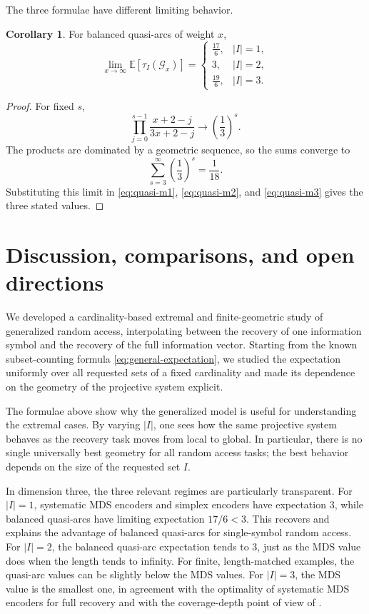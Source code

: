 \documentclass[11pt,a4paper]{article}
\numberwithin{equation}{section}
\theoremstyle{definition}
\theoremstyle{definition}
\newtheorem{corollary}[definition]{Corollary}
\newcommand{\E}{\mathbb{E}}
\newcommand{\cG}{\mathcal{G}}
\begin{document}
The three formulae have different limiting behavior.

\begin{corollary}\label{cor:quasi-asymptotics}
For balanced quasi-arcs of weight $x$,
\[
\lim_{x\to\infty}\E[\tau_I(\cG_x)]
=
\begin{cases}
\frac{17}{6}, & |I|=1,\\[1mm]
3, & |I|=2,\\[1mm]
\frac{19}{6}, & |I|=3.
\end{cases}
\]
\end{corollary}

\begin{proof}
For fixed $s$,
\[
\prod_{j=0}^{s-1}\frac{x+2-j}{3x+2-j}\longrightarrow \left(\frac13\right)^s.
\]
The products are dominated by a geometric sequence, so the sums converge to
\[
\sum_{s=3}^{\infty}\left(\frac13\right)^s=\frac{1}{18}.
\]
Substituting this limit in \eqref{eq:quasi-m1}, \eqref{eq:quasi-m2}, and \eqref{eq:quasi-m3} gives the three stated values.
\end{proof}

\section{Discussion, comparisons, and open directions}\label{sec:discussion}

{We developed a cardinality-based extremal and finite-geometric study of generalized random access, interpolating between the recovery of one information symbol and the recovery of the full information vector.  Starting from the known subset-counting formula \eqref{eq:general-expectation}, we studied the expectation uniformly over all requested sets of a fixed cardinality and made its dependence on the geometry of the projective system explicit.}

The formulae above show why the generalized model is useful for understanding the extremal cases.  By varying $|I|$, one sees how the same projective system behaves as the recovery task moves from local to global.  In particular, there is no single universally best geometry for all random access tasks; the best behavior depends on the size of the requested set $I$.

In dimension three, the three relevant regimes are particularly transparent.  For $|I|=1$, systematic MDS encoders and simplex encoders have expectation $3$, while balanced quasi-arcs have limiting expectation $17/6<3$.  This recovers and explains the advantage of balanced quasi-arcs for single-symbol random access.  For $|I|=2$, the balanced quasi-arc expectation tends to $3$, just as the MDS value does when the length tends to infinity.  For finite, length-matched examples, the quasi-arc values can be slightly below the MDS values.  For $|I|=3$, the MDS value is the smallest one, in agreement with the optimality of systematic MDS encoders for full recovery and with the coverage-depth point of view of \cite{bar2024cover,bertuzzo2025coverage}.
\end{document}

